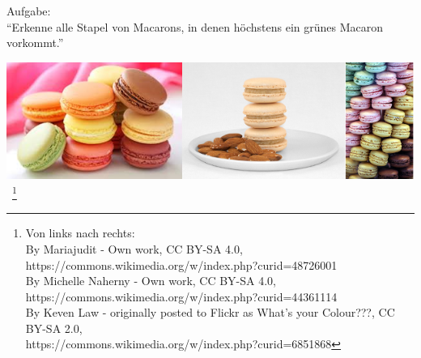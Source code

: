 \begin{Bsp}Aufgabe: 
  \\
  \label{Bsp:3.1}
  "`Erkenne alle Stapel von Macarons, in denen höchstens ein grünes Macaron vorkommt."'
\begin{center}
  \includegraphics[scale=0.4]{macaron-stacks.png}~\footnote{
  \tiny Von links nach rechts: \\
By Mariajudit - Own work, CC BY-SA 4.0, https://commons.wikimedia.org/w/index.php?curid=48726001
  \\
By Michelle Naherny - Own work, CC BY-SA 4.0, https://commons.wikimedia.org/w/index.php?curid=44361114
  \\
By Keven Law - originally posted to Flickr as What's your Colour???, CC BY-SA 2.0, \\ https://commons.wikimedia.org/w/index.php?curid=6851868
}


\end{center}
\end{Bsp}
